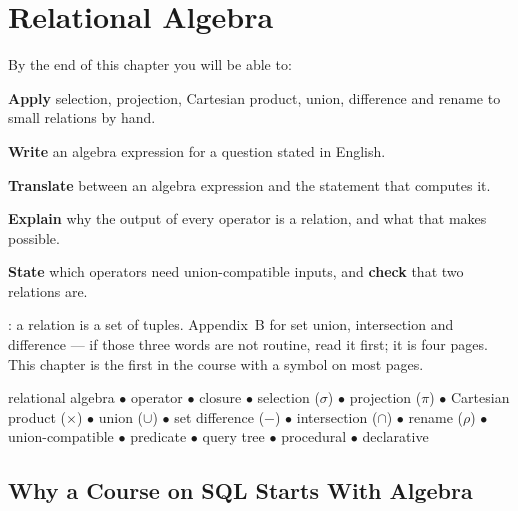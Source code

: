 \chapter{Relational Algebra}\label{ch:algebra}

\begin{outcomes}
By the end of this chapter you will be able to:
\begin{tight}
  \item \textbf{Apply} selection, projection, Cartesian product, union,
        difference and rename to small relations by hand.
  \item \textbf{Write} an algebra expression for a question stated in English.
  \item \textbf{Translate} between an algebra expression and the
         statement that computes it.
  \item \textbf{Explain} why the output of every operator is a relation, and
        what that makes possible.
  \item \textbf{State} which operators need union-compatible inputs, and
        \textbf{check} that two relations are.
\end{tight}
\end{outcomes}

\begin{prereq}
: a relation is a set of tuples. Appendix~B for set union,
intersection and difference --- if those three words are not routine, read it
first; it is four pages. This chapter is the first in the course with a
symbol on most pages.
\end{prereq}

\begin{keyterms}
relational algebra $\bullet$ operator $\bullet$ closure $\bullet$ selection
($\sigma$) $\bullet$ projection ($\pi$) $\bullet$ Cartesian product
($\times$) $\bullet$ union ($\cup$) $\bullet$ set difference ($-$) $\bullet$
intersection ($\cap$) $\bullet$ rename ($\rho$) $\bullet$ union-compatible
$\bullet$ predicate $\bullet$ query tree $\bullet$ procedural $\bullet$
declarative
\end{keyterms}

\section{Why a Course on SQL Starts With Algebra}


